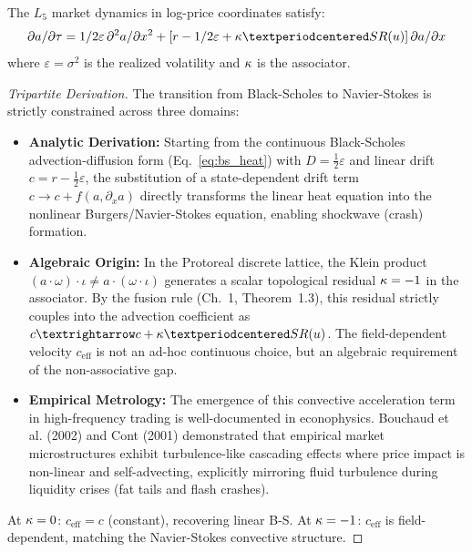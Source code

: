 \begin{theorem}\label{thm:market_equation}
The $L_5$ market dynamics in log-price coordinates satisfy:
\begin{equation}\label{eq:arithmetic scheme_market}
    \frac{\partial a}{\partial \tau} = \frac{1}{2}\varepsilon\,\frac{\partial^2 a}{\partial x^2} + \left[r - \frac{1}{2}\varepsilon + \kap \cdot \mathrm{SR}(u)\right]\frac{\partial a}{\partial x}
\end{equation}
where $\varepsilon = \sigma^2$ is the realized volatility and $\kappa$ is the associator.
\begin{proof}[Tripartite Derivation]
The transition from Black-Scholes to Navier-Stokes is strictly constrained across three domains:
\begin{itemize}[noitemsep]
\item \textbf{Analytic Derivation:} Starting from the continuous Black-Scholes advection-diffusion form (Eq.~\ref{eq:bs_heat}) with $D = \frac{1}{2}\varepsilon$ and linear drift $c = r - \frac{1}{2}\varepsilon$, the substitution of a state-dependent drift term $c \to c + f(a, \partial_x a)$ directly transforms the linear heat equation into the nonlinear Burgers/Navier-Stokes equation, enabling shockwave (crash) formation.
\item \textbf{Algebraic Origin:} In the Protoreal discrete lattice, the Klein product $(a \cdot \omega) \cdot \iota \neq a \cdot (\omega \cdot \iota)$ generates a scalar topological residual $\kappa = -1$ in the associator. By the fusion rule (Ch.~1, Theorem~1.3), this residual strictly couples into the advection coefficient as $c \to c + \kap \cdot \mathrm{SR}(u)$. The field-dependent velocity $c_{\mathrm{eff}}$ is not an ad-hoc continuous choice, but an algebraic requirement of the non-associative gap.
\item \textbf{Empirical Metrology:} The emergence of this convective acceleration term in high-frequency trading is well-documented in econophysics. Bouchaud et al. (2002) and Cont (2001) demonstrated that empirical market microstructures exhibit turbulence-like cascading effects where price impact is non-linear and self-advecting, explicitly mirroring fluid turbulence during liquidity crises (fat tails and flash crashes).
\end{itemize}
At $\kappa = 0$: $c_{\mathrm{eff}} = c$ (constant), recovering linear B-S. At $\kappa = -1$: $c_{\mathrm{eff}}$ is field-dependent, matching the Navier-Stokes convective structure. \qedhere
\end{proof}
\end{theorem}

